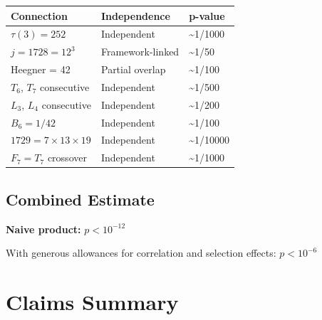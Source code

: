 \documentclass[
  11pt,
  letterpaper,
  twoside,
  openright]{book}
\begin{document}
\begin{longtable}[]{@{}lll@{}}
\toprule\noalign{}
Connection & Independence & p-value \\
\midrule\noalign{}
\endhead
\bottomrule\noalign{}
\endlastfoot
\(\tau(3) = 252\) & Independent & \textasciitilde1/1000 \\
\(j = 1728 = 12^3\) & Framework-linked & \textasciitilde1/50 \\
Heegner = 42 & Partial overlap & \textasciitilde1/100 \\
\(T_6\), \(T_7\) consecutive & Independent & \textasciitilde1/500 \\
\(L_3\), \(L_4\) consecutive & Independent & \textasciitilde1/200 \\
\(B_6 = 1/42\) & Independent & \textasciitilde1/100 \\
\(1729 = 7 \times 13 \times 19\) & Independent &
\textasciitilde1/10000 \\
\(F_7 = T_7\) crossover & Independent & \textasciitilde1/1000 \\
\end{longtable}

\subsection{Combined Estimate}\label{combined-estimate}

\textbf{Naive product:} \(p < 10^{-12}\)

With generous allowances for correlation and selection effects:
\textbf{\(p < 10^{-6}\)}

\section{Claims Summary}\label{claims-summary}
\end{document}

